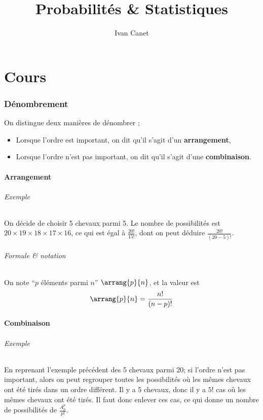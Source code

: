 \documentclass[10pt,a4paper,french]{article}
\begin{document}
\title{Probabilités \& Statistiques}
\author{Ivan Canet}
\maketitle

\tableofcontents

\part{Cours}

\section{Dénombrement}

On distingue deux manières de dénombrer ;

\begin{itemize}
\item Lorsque l'ordre est important, on dit qu'il s'agit d'un \textbf{arrangement},
\item Lorsque l'ordre n'est pas important, on dit qu'il s'agit d'une \textbf{combinaison}.
\end{itemize}

\subsection{Arrangement}

\paragraph{Exemple}
On décide de choisir 5 chevaux parmi 5. Le nombre de possibilités est $20 \times 19 \times 18 \times 17 \times 16$, ce qui est égal à $\frac{20!}{15!}$, dont on peut déduire $\frac{20!}{(20-5)!}$.

\paragraph{Formule \& notation}
On note ``$p$ éléments parmi $n$'' $\arrang{p}{n}$, et la valeur est \[ \arrang{p}{n} = \frac{n!}{(n-p)!} \]

\subsection{Combinaison}

\paragraph{Exemple}
En reprenant l'exemple précédent des 5 chevaux parmi 20; si l'ordre n'est pas important, alors on peut regrouper toutes les possibilités où les mêmes chevaux ont été tirés dans un ordre différent. Il y a 5 chevaux, donc il y a $5!$ cas où les mêmes chevaux ont été tirés. Il faut donc enlever ces cas, ce qui donne un nombre de possibilités de $\frac{A_n^p}{p!}$.
\end{document}
